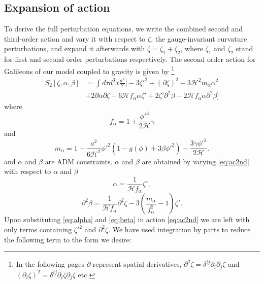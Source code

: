 \documentclass[12pt,a4paper]{article}
\numberwithin{equation}{section}
\numberwithin{equation}{section}
\begin{document}
\subsection{Expansion of action}
To derive the full perturbation equations, we write the combined second and third-order action and vary it with respect to $\zeta$, the gauge-invariant curvature perturbations, and expand it afterwards with $\zeta = \zeta_1 + \zeta_2$, where $\zeta_1$ and $\zeta_2$ stand for first and second order perturbations respectively. The second order action for Galileons of our model coupled to gravity  is given by \cite{Gao:2011qe,Cai:2012va}\footnote{In the following pages $\partial$ represent spatial derivatives, $\partial^2 \zeta = \delta^{ij} \partial_i \partial_j \zeta$ and $(\partial_i \zeta)^2 = \delta^{ij} \partial_i\zeta \partial_j \zeta$ etc. }
\begin{equation}
\begin{split}
    S_{2}[\zeta,\alpha,\beta] &= \int d\tau d^3x  \frac{ a^2}{2} \Bigg[-3 \zeta'^2+ (\partial \zeta)^2-3\mathcal{H}^2 m_{\alpha} \alpha^2%
    \\
   \;\;\;\;\;\ &%
  +2 \partial \alpha \partial \zeta + 6\mathcal{H} f_{\alpha} \alpha \zeta'+2 \zeta'\partial^2 \beta -2\mathcal{H} f_{\alpha} \alpha \partial^2 \beta  \Bigg]
    \label{eq:ac2nd}
   \end{split}
\end{equation}
where
\begin{equation}
    f_{\alpha} = 1+ \frac{\phi'^3}{2\mathcal{H}} \gamma
\end{equation}
and
\begin{equation}
    m_{\alpha} = 1-\frac{a^2}{6\mathcal{H}^2} \phi'^2 \left(1-g(\phi)+  3 \beta \phi'^2  \right) -\frac{3 \gamma \phi'^3}{2\mathcal{H}}.
\end{equation}
and $\alpha$ and $\beta$ are ADM constraints. $\alpha$ and $\beta$ are obtained by varying \eqref{eq:ac2nd} with respect to $\alpha$ and $\beta$
\begin{equation}
    \alpha = \frac{1}{\mathcal{H}  f_{\alpha}} \zeta',
    \label{eq:alpha}
\end{equation}
\begin{equation}
\partial^2 \beta = \frac{1}{\mathcal{H}  f_{\alpha}}  \partial^2 \zeta-3\left(\frac{m_{\alpha}}{f_{\alpha}^2}-1 \right) \zeta' .
\label{eq:beta}
\end{equation}
Upon substituting \eqref{eq:alpha} and \eqref{eq:beta} in action \eqref{eq:ac2nd} 
we are left with only terms containing $\zeta'^2$ and $\partial^2 \zeta$. We have used integration by parts to reduce the following  term to the form we desire:
\end{document}

